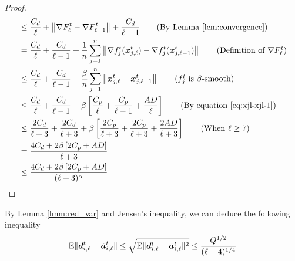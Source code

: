 \begin{proof}
\begin{align}
%
%
&\leq \frac{C_{d}}{\ell} + \norm{\nabla F_{\ell}^{t} - \nabla F_{\ell-1}^{t}} + \frac{C_{d}}{\ell-1} \tag{By Lemma~\ref{lem:convergence}}\\
%
%
&=  \frac{C_{d}}{\ell} + \frac{C_{d}}{\ell-1} + \frac{1}{n} \sum_{j=1}^{n} \norm{\nabla f_{j}^{t}(\vect{x}_{j,\ell}^{t}) - \nabla f_{j}^{t}(\vect{x}_{j,\ell-1}^{t})} \tag{Definition of $\nabla F_{\ell}^{t}$}\\
%
%
&\leq \frac{C_{d}}{\ell} + \frac{C_{d}}{\ell-1} + \frac{\beta}{n} \sum_{j=1}^{n} \norm{\vect{x}_{j,\ell}^{t} - \vect{x}_{j,\ell-1}^{t}} \tag{$f_{j}^{t}$ is $\beta$-smooth}\\
%
%
&\leq \frac{C_{d}}{\ell} + \frac{C_{d}}{\ell-1} + \beta \left[ \frac{C_p}{\ell} + \frac{C_p}{\ell-1} + \frac{AD}{\ell}\right]  \tag{By equation~\ref{eq:xjl-xjl-1}}\\
%
%
&\leq \frac{2C_{d}}{\ell+3} + \frac{2C_{d}}{\ell+3} + \beta \left[ \frac{2C_p}{\ell+3} + \frac{2C_p}{\ell+3} + \frac{2AD}{\ell+3}\right]  \tag{When $\ell \geq 7$}  \\
%
%
&= \frac{4C_{d} + 2\beta \left[ 2C_{p} + AD \right]}{\ell+3}\\
%
&\leq \frac{4C_{d} + 2\beta \left[ 2C_{p} + AD \right]}{(\ell+3)^{\alpha}}
\end{align}
\end{proof}

\begin{remark}
\label{rmk:quantized_fw}
By Lemma \ref{lmm:red_var} and Jensen's inequality, we can deduce the following inequality
\begin{equation*}
    \mathbb{E}{\|\bm{d}^t_{i,\ell} - \Tilde{\bm{a}}^t_{i,\ell} \|} \leq \sqrt{\mathbb{E}{\|\bm{d}^t_{i,\ell} - \Tilde{\bm{a}}^t_{i,\ell} \|^{2}}} \leq \frac{Q^{1/2}}{(\ell + 4)^{1/4}}
\end{equation*}
\end{remark}

